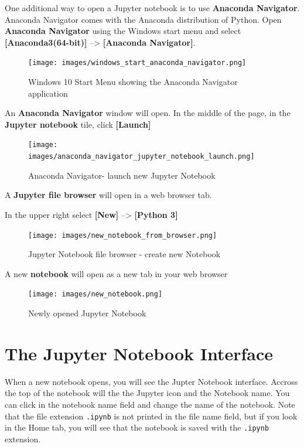\documentclass{book}
\begin{document}
    
        One additional way to open a Jupyter notebook is to use \textbf{Anaconda
Navigator}. Anaconda Navigator comes with the Anaconda distribution of
Python. Open \textbf{Anaconda Navigator} using the Windows start menu
and select \textbf{{[}Anaconda3(64-bit){]}} --\textgreater{}
\textbf{{[}Anaconda Navigator{]}}.

\begin{figure}
\centering
\texttt{[image: images/windows\_start\_anaconda\_navigator.png]}
\caption{Windows 10 Start Menu showing the Anaconda Navigator
application}
\end{figure}

An \textbf{Anaconda Navigator} window will open. In the middle of the
page, in the \textbf{Jupyter notebook} tile, click \textbf{{[}Launch{]}}

\begin{figure}
\centering
\texttt{[image: images/anaconda\_navigator\_jupyter\_notebook\_launch.png]}
\caption{Anaconda Navigator- launch new Jupyter Notebook}
\end{figure}

A \textbf{Jupyter file browser} will open in a web browser tab.

In the upper right select \textbf{{[}New{]}} --\textgreater{}
\textbf{{[}Python 3{]}}

\begin{figure}
\centering
\texttt{[image: images/new\_notebook\_from\_browser.png]}
\caption{Jupyter Notebook file browser - create new Notebook}
\end{figure}

A new \textbf{notebook} will open as a new tab in your web browser

\begin{figure}
\centering
\texttt{[image: images/new\_notebook.png]}
\caption{Newly opened Jupyter Notebook}
\end{figure}
    




    
        \section{The Jupyter Notebook
Interface}\label{the-jupyter-notebook-interface}

When a new notebook opens, you will see the Jupter Notebook interface.
Accross the top of the notebook will the the Jupyter icon and the
Notebook name. You can click in the notebook name field and change the
name of the notebook. Note that the file extension \lstinline!.ipynb! is
not printed in the file name field, but if you look in the Home tab, you
will see that the notebook is saved with the \lstinline!.ipynb!
extension.
    
\end{document}
